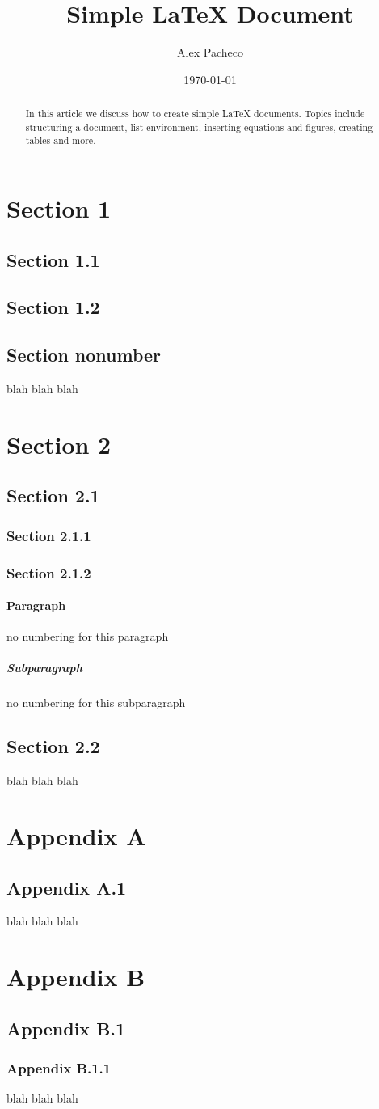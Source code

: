 \documentclass[12pt,fleqn]{article}
\title{Simple \LaTeX{} Document}
\author{Alex Pacheco}
\date{\today}
\begin{document}
\maketitle
\tableofcontents

\begin{abstract}
  In this article we discuss how to create simple \LaTeX{} documents. Topics include structuring a document, list environment, inserting equations and figures, creating tables and more.
\end{abstract}

\section{Section 1}
\subsection{Section 1.1}
\subsection{Section 1.2}
\subsection*{Section nonumber}
  blah blah blah

\section{Section 2}
\subsection{Section 2.1}
\subsubsection{Section 2.1.1}
\subsubsection{Section 2.1.2}
\paragraph{Paragraph} no numbering for this paragraph
\subparagraph{Subparagraph} no numbering for this subparagraph
\subsection{Section 2.2}
  blah blah blah

\appendix
\section{Appendix A}
\subsection{Appendix A.1}
  blah blah blah

\section{Appendix B}
\subsection{Appendix B.1}
\subsubsection{Appendix B.1.1}
  blah blah blah
\end{document}
